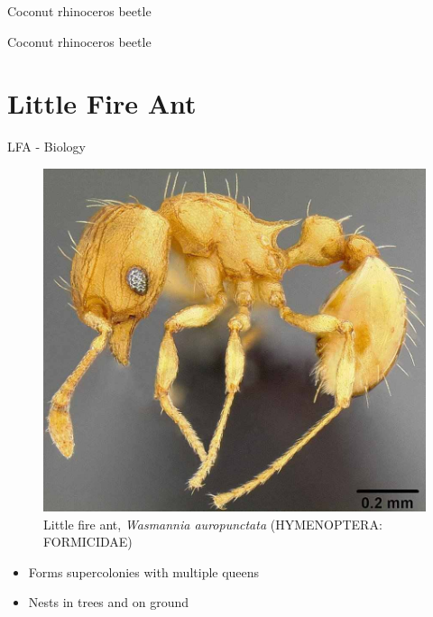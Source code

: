 \documentclass[]{beamer}
\begin{document}
\begin{frame}{Coconut rhinoceros beetle}
\end{frame}

\begin{frame}{Coconut rhinoceros beetle}
\end{frame}

\section*{Little Fire Ant}

\begin{frame}{LFA - Biology}
	\begin{figure}
	\includegraphics[height=0.6\textheight]{lfa.jpg}
	\caption{Little fire ant, \textit{Wasmannia auropunctata} (HYMENOPTERA: FORMICIDAE)}
	\end{figure}
	\begin{itemize}
		\item Forms supercolonies with multiple queens
		\item Nests in trees and on ground
	\end{itemize}
\end{frame}
\end{document}
